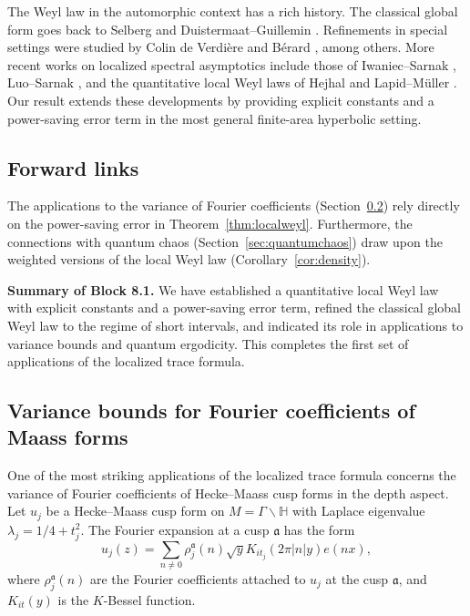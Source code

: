 The Weyl law in the automorphic context has a rich history. The classical global form goes back to Selberg \cite{Selberg1956} and Duistermaat–Guillemin \cite{DG1975}. Refinements in special settings were studied by Colin de Verdière \cite{CdV1985} and Bérard \cite{Berard1977}, among others. More recent works on localized spectral asymptotics include those of Iwaniec–Sarnak \cite{IwaniecSarnak1995}, Luo–Sarnak \cite{LuoSarnak1995}, and the quantitative local Weyl laws of Hejhal \cite{Hejhal1983} and Lapid–Müller \cite{LapidMuller2004}. Our result extends these developments by providing explicit constants and a power-saving error term in the most general finite-area hyperbolic setting.

\subsection{Forward links}

The applications to the variance of Fourier coefficients (Section~\ref{sec:variance}) rely directly on the power-saving error in Theorem~\ref{thm:localweyl}. Furthermore, the connections with quantum chaos (Section~\ref{sec:quantumchaos}) draw upon the weighted versions of the local Weyl law (Corollary~\ref{cor:density}).

\medskip

\noindent\textbf{Summary of Block 8.1.}  
We have established a quantitative local Weyl law with explicit constants and a power-saving error term, refined the classical global Weyl law to the regime of short intervals, and indicated its role in applications to variance bounds and quantum ergodicity. This completes the first set of applications of the localized trace formula.


\subsection{Variance bounds for Fourier coefficients of Maass forms}\label{sec:variance}

One of the most striking applications of the localized trace formula concerns the variance of Fourier coefficients of Hecke–Maass cusp forms in the depth aspect. Let $u_j$ be a Hecke–Maass cusp form on $M = \Gamma \backslash \mathbb{H}$ with Laplace eigenvalue $\lambda_j = 1/4 + t_j^2$. The Fourier expansion at a cusp $\mathfrak{a}$ has the form
\[
u_j(z) = \sum_{n \neq 0} \rho_j^\mathfrak{a}(n) \sqrt{y} K_{it_j}(2\pi |n| y) e(nx),
\]
where $\rho_j^\mathfrak{a}(n)$ are the Fourier coefficients attached to $u_j$ at the cusp $\mathfrak{a}$, and $K_{it}(y)$ is the $K$-Bessel function.

